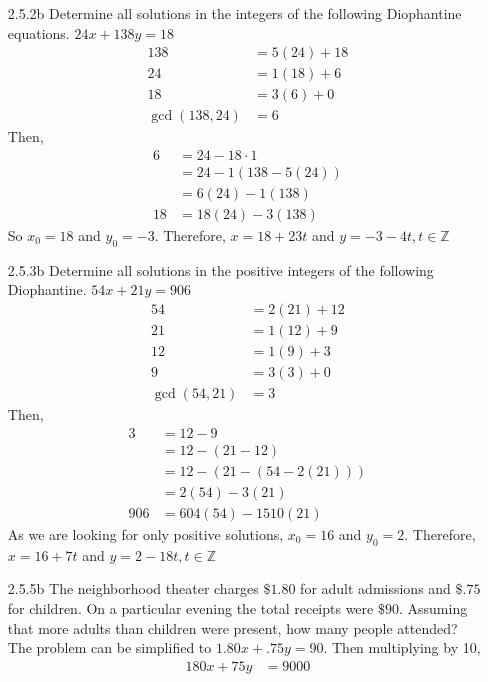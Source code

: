 \documentclass[12pt]{article}
\newcommand{\Z}{\mathds{Z}}
\begin{document}
\begin{enumerate}
	\item[2.5.2b] Determine all solutions in the integers of the following Diophantine equations. $ 24x+138y=18 $
        \begin{align*}
        	138 &= 5(24) + 18\\
        	24  &= 1(18) + 6\\
        	18  &= 3(6)+0\\
        	\gcd(138,24) &= 6
        \end{align*}
        Then,
        \begin{align*}
	        6 &= 24-18\cdot 1\\
	          &= 24-1(138-5(24))\\
	          &= 6(24) - 1(138)\\
	       18 &= 18(24)-3(138)  
        \end{align*}
        So $ x_0 = 18 $ and $ y_0 = -3 $. Therefore, $ x=18+23t $ and $ y=-3-4t , t\in\Z$
    \item[2.5.3b] Determine all solutions in the positive integers of the following Diophantine. $ 54x+21y=906 $
    \begin{align*}
    	54 &= 2(21)+12\\
    	21 &= 1(12)+9\\
    	12 &= 1(9)+3\\
    	9 &= 3(3)+0\\
    	\gcd(54,21)&=3
    \end{align*}
    Then,
    \begin{align*}
	    3 &= 12-9\\
	      &= 12-(21-12)\\
	      &= 12-(21-(54-2(21)))\\
	      &= 2(54)-3(21)\\
	  906 &= 604(54)-1510(21)
    \end{align*}
    As we are looking for only positive solutions, $ x_0 = 16 $ and $ y_0 = 2 $. Therefore, $ x=16+7t $ and $ y=2-18t , t\in\Z$
    \item[2.5.5b] The neighborhood theater charges $\$1.80$ for adult admissions and $ \$.75 $ for children. On a particular evening the total receipts were $ \$90 $. Assuming that more adults than children were present, how many people attended?\\
    The problem can be simplified to $ 1.80x + .75y = 90 $. Then multiplying by 10,
    \begin{align*}
	    180x + 75y &= 9000\\

\end{align*}
\end{enumerate}
\end{document}
